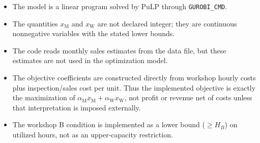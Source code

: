 \begin{itemize}
    \item The model is a linear program solved by PuLP through \texttt{GUROBI\_CMD}.
    \item The quantities \(x_{\mathrm{M}}\) and \(x_{\mathrm{W}}\) are not declared integer; they are continuous nonnegative variables with the stated lower bounds.
    \item The code reads monthly sales estimates from the data file, but these estimates are not used in the optimization model.
    \item The objective coefficients are constructed directly from workshop hourly costs plus inspection/sales cost per unit. Thus the implemented objective is exactly the maximization of \(\alpha_{\mathrm{M}} x_{\mathrm{M}} + \alpha_{\mathrm{W}} x_{\mathrm{W}}\), not profit or revenue net of costs unless that interpretation is imposed externally.
    \item The workshop B condition is implemented as a lower bound (\(\ge H_B\)) on utilized hours, not as an upper-capacity restriction.
\end{itemize}
